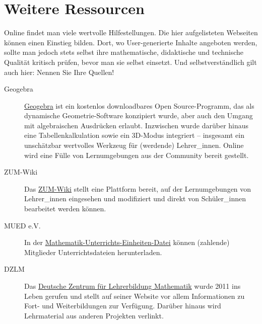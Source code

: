 \documentclass[
  bibliography=totoc,
  oneside,
  12pt,
  a4paper]{scrbook}
\begin{document}
\hypertarget{weitere-ressourcen}{%
\section{Weitere Ressourcen}\label{weitere-ressourcen}}

Online findet man viele wertvolle Hilfestellungen. Die hier
aufgelisteten Webseiten können einen Einstieg bilden. Dort, wo
User-generierte Inhalte angeboten werden, sollte man jedoch stets selbst
ihre mathematische, didaktische und technische Qualität kritisch prüfen,
bevor man sie selbst einsetzt. Und selbstverständlich gilt auch hier:
Nennen Sie Ihre Quellen!

\begin{description}
\item[Geogebra]
\href{https://www.geogebra.org}{Geogebra} ist ein kostenlos downloadbares Open
Source-Programm, das als dynamische Geometrie-Software konzipiert
wurde, aber auch den Umgang mit algebraischen Ausdrücken erlaubt.
Inzwischen wurde darüber hinaus eine Tabellenkalkulation sowie ein
3D-Modus integriert -- insgesamt ein unschätzbar wertvolles Werkzeug
für (werdende) Lehrer\_innen. Online wird eine Fülle von
Lernumgebungen aus der Community bereit gestellt.
\item[ZUM-Wiki]
Das \href{https://wiki.zum.de}{ZUM-Wiki} stellt eine Plattform bereit, auf der
Lernumgebungen von Lehrer\_innen eingesehen und modifiziert und
direkt von Schüler\_innen bearbeitet werden können.
\item[MUED e.V.]
In der \href{https://www.mued.de}{Mathematik-Unterrichts-Einheiten-Datei} können (zahlende) Mitglieder Unterrichtsdateien herunterladen.
\item[DZLM]
Das \href{https://www.dzlm.de}{Deutsche Zentrum für Lehrerbildung Mathematik} wurde 2011 ins Leben gerufen und stellt auf seiner Website vor allem Informationen zu Fort- und Weiterbildungen zur Verfügung. Darüber hinaus wird Lehrmaterial aus anderen Projekten verlinkt.
\end{description}

\printbibliography
\end{document}
